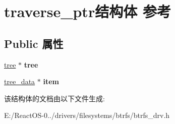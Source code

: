 \hypertarget{structtraverse__ptr}{}\section{traverse\+\_\+ptr结构体 参考}
\label{structtraverse__ptr}
\subsection*{Public 属性}
\begin{DoxyCompactItemize}
\item 
\mbox{\label{structtraverse__ptr_acfee1e347c032e1d927a37646a364d7a}} 
\hyperlink{struct__tree}{tree} $\ast$ {\bfseries tree}
\item 
\mbox{\label{structtraverse__ptr_a9759eeabad764f3ddd8c3de596e7625b}} 
\hyperlink{struct__tree__data}{tree\+\_\+data} $\ast$ {\bfseries item}
\end{DoxyCompactItemize}


该结构体的文档由以下文件生成\+:\begin{DoxyCompactItemize}
\item 
E\+:/\+React\+O\+S-\/0../drivers/filesystems/btrfs/btrfs\+\_\+drv.\+h\end{DoxyCompactItemize}
